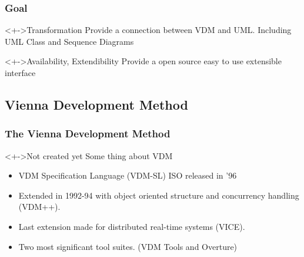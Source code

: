 %
%
\frame
{
  \frametitle{Goal}

\begin{center}

	\begin{block}<+->{Transformation}
	Provide a connection between VDM and UML. Including UML Class and Sequence Diagrams
	\end{block}
\vspace{1cm}
	\begin{block}<+->{Availability, Extendibility}
	Provide a open source easy to use extensible interface
	\end{block}
%	  	
\end{center}
}


\subsection{Vienna Development Method}
%
%
\frame
{
  \frametitle{The Vienna Development Method}


	\begin{block}<+->{Not created yet}
	Some thing about VDM
	\end{block}

  \begin{itemize}
  		\item VDM Specification Language (VDM-SL) ISO released in '96
  		\item Extended in 1992-94 with object oriented structure and concurrency handling (VDM++).
  		\item Last extension made for distributed real-time systems (VICE).
  		\item Two most significant tool suites. (VDM Tools and Overture)
	  	
  \end{itemize}


}


